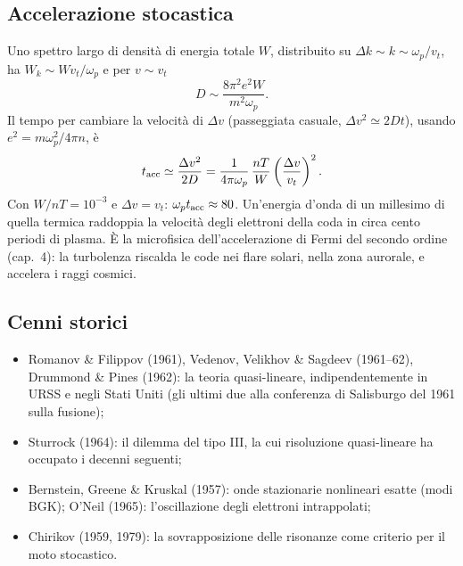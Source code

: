 \subsection{Accelerazione stocastica}
Uno spettro largo di densità di energia totale $W$, distribuito su $\Delta k\sim k\sim\omega_p/v_t$, ha $W_k\sim Wv_t/\omega_p$ e per $v\sim v_t$
\begin{equation}
D\sim\frac{8\pi^2e^2W}{m^2\omega_p}.
\end{equation}
Il tempo per cambiare la velocità di $\Delta v$ (passeggiata casuale, $\Delta v^2\simeq2Dt$), usando $e^2=m\omega_p^2/4\pi n$, è
\begin{equation}
t_{\rm acc}\simeq\frac{\Delta v^2}{2D}=\frac{1}{4\pi\omega_p}\,\frac{nT}{W}\left(\frac{\Delta v}{v_t}\right)^2 .
\end{equation}
Con $W/nT=10^{-3}$ e $\Delta v=v_t$: $\omega_pt_{\rm acc}\approx80$. Un'energia d'onda di un millesimo di quella termica raddoppia la velocità degli elettroni della coda in circa cento periodi di plasma. È la microfisica dell'accelerazione di Fermi del secondo ordine (cap.~4): la turbolenza riscalda le code nei flare solari, nella zona aurorale, e accelera i raggi cosmici.

\subsection{Cenni storici}
\begin{itemize}
\item Romanov \& Filippov (1961), Vedenov, Velikhov \& Sagdeev (1961--62), Drummond \& Pines (1962): la teoria quasi-lineare, indipendentemente in URSS e negli Stati Uniti (gli ultimi due alla conferenza di Salisburgo del 1961 sulla fusione);
\item Sturrock (1964): il dilemma del tipo III, la cui risoluzione quasi-lineare ha occupato i decenni seguenti;
\item Bernstein, Greene \& Kruskal (1957): onde stazionarie nonlineari esatte (modi BGK); O'Neil (1965): l'oscillazione degli elettroni intrappolati;
\item Chirikov (1959, 1979): la sovrapposizione delle risonanze come criterio per il moto stocastico.
\end{itemize}

